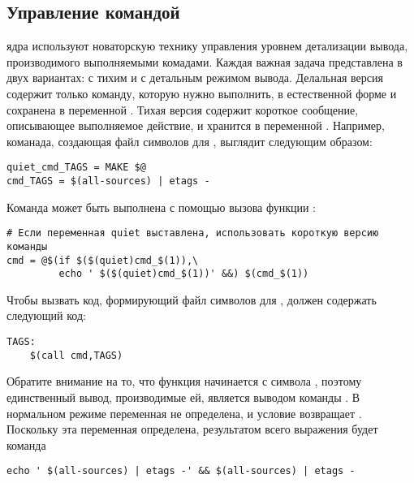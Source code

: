 \subsection{Управление командой }
\label{sec:managing_command_echo}
 ядра используют новаторскую технику управления уровнем
детализации вывода, производимого выполняемыми комадами. Каждая важная
задача представлена в двух вариантах: с тихим и с детальным режимом
вывода. Делальная версия содержит только команду, которую нужно
выполнить, в естественной форме и сохранена в переменной
. Тихая версия содержит короткое
сообщение, описывающее выполняемое действие, и хранится в переменной
. Например, команада, создающая
файл символов для , выглядит следующим образом:

\begin{verbatim}
quiet_cmd_TAGS = MAKE $@
cmd_TAGS = $(all-sources) | etags -
\end{verbatim}

Команда может быть выполнена с помощью вызова функции :

\begin{verbatim}
# Если переменная quiet выставлена, использовать короткую версию команды
cmd = @$(if $($(quiet)cmd_$(1)),\
         echo ' $($(quiet)cmd_$(1))' &&) $(cmd_$(1))
\end{verbatim}

Чтобы вызвать код, формирующий файл символов для ,
\Makefile{} должен содержать следующий код:

\begin{verbatim}
TAGS:
    $(call cmd,TAGS)
\end{verbatim}

Обратите внимание на то, что функция  начинается с символа
\Monospace{@}, поэтому единственный вывод, производимые ей, является
выводом команды \command{echo}. В нормальном режиме переменная
 не определена, и условие
 возвращает .
Поскольку эта переменная определена, результатом всего выражения будет
команда

\begin{verbatim}
echo ' $(all-sources) | etags -' && $(all-sources) | etags -
\end{verbatim}

